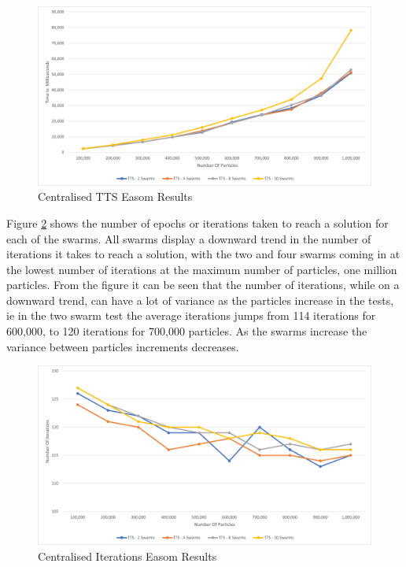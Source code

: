 \documentclass[oneside,12pt]{book}
\begin{document}
\begin{figure}[H]
    \centering
    \includegraphics[scale=0.45]{Images/Graphs/CentralisedEasomTTS.png}
    \caption{Centralised TTS Easom Results}
    \label{fig:Centralised_TTS_Easom_Results}
\end{figure}

Figure \ref{fig:Centralised_Epoc_Easom_Results} shows the number of epochs or iterations taken to reach a solution for each of the swarms. All swarms display a downward trend in the number of iterations it takes to reach a solution, with the two and four swarms coming in at the lowest number of iterations at the maximum number of particles, one million particles. From the figure it can be seen that the number of iterations, while on a downward trend, can have a lot of variance as the particles increase in the tests, ie in the two swarm test the average iterations jumps from 114 iterations for 600,000, to 120 iterations for 700,000 particles. As the swarms increase the variance between particles increments decreases. 

\begin{figure}[H]
    \centering
    \includegraphics[scale=0.45]{Images/Graphs/CentralisedEasomEpoch.png}
    \caption{Centralised Iterations Easom Results}
    \label{fig:Centralised_Epoc_Easom_Results}
\end{figure}
\end{document}
